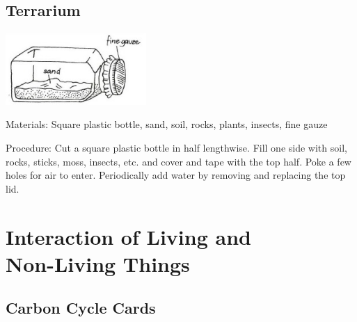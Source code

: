\begin{multicols}{2}
\subsection{Terrarium} %

\begin{center}
\includegraphics[width=0.4\textwidth]{./img/vso/terrarium.jpg}
\end{center}

\begin{description*}
\item[Materials:]{Square plastic bottle, sand, soil, rocks, plants, insects, fine gauze}
\item[Procedure:]{Cut a square plastic bottle in half lengthwise. Fill one side with soil, rocks, sticks, moss, insects, etc. and cover and tape with the top half. Poke a few holes for air to enter. Periodically add water by removing and replacing the top lid.}
\end{description*}


\section*{Interaction of Living and \hfill \\ Non-Living Things}


\subsection{Carbon Cycle Cards} %


\end{multicols}
